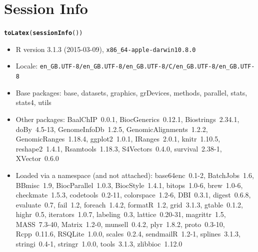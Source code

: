 \documentclass{article}\usepackage[]{graphicx}\usepackage[usenames,dvipsnames]{color}
\makeatletter
\newcommand{\hlstd}[1]{\textcolor[rgb]{0.345,0.345,0.345}{#1}}%
\newcommand{\hlkwd}[1]{\textcolor[rgb]{0.737,0.353,0.396}{\textbf{#1}}}%
\newenvironment{kframe}{%
 \def\at@end@of@kframe{}%
 \ifinner\ifhmode%
  \def\at@end@of@kframe{\end{minipage}}%
  \begin{minipage}{\columnwidth}%
 \fi\fi%
 \def\FrameCommand##1{\hskip\@totalleftmargin \hskip-\fboxsep
 \colorbox{shadecolor}{##1}\hskip-\fboxsep
     \hskip-\linewidth \hskip-\@totalleftmargin \hskip\columnwidth}%
 \MakeFramed {\advance\hsize-\width
   \@totalleftmargin\z@ \linewidth\hsize
   \@setminipage}}%
 {\par\unskip\endMakeFramed%
 \at@end@of@kframe}
\makeatother
\begin{document}
\section{Session Info}
\begin{kframe}
\begin{alltt}
\hlkwd{toLatex}\hlstd{(}\hlkwd{sessionInfo}\hlstd{())}
\end{alltt}
\end{kframe}\begin{itemize}\raggedright
  \item R version 3.1.3 (2015-03-09), \verb|x86_64-apple-darwin10.8.0|
  \item Locale: \verb|en_GB.UTF-8/en_GB.UTF-8/en_GB.UTF-8/C/en_GB.UTF-8/en_GB.UTF-8|
  \item Base packages: base, datasets, graphics, grDevices, methods, parallel,
    stats, stats4, utils
  \item Other packages: BaalChIP~0.0.1, BiocGenerics~0.12.1, Biostrings~2.34.1,
    doBy~4.5-13, GenomeInfoDb~1.2.5, GenomicAlignments~1.2.2,
    GenomicRanges~1.18.4, ggplot2~1.0.1, IRanges~2.0.1, knitr~1.10.5,
    reshape2~1.4.1, Rsamtools~1.18.3, S4Vectors~0.4.0, survival~2.38-1,
    XVector~0.6.0
  \item Loaded via a namespace (and not attached): base64enc~0.1-2,
    BatchJobs~1.6, BBmisc~1.9, BiocParallel~1.0.3, BiocStyle~1.4.1,
    bitops~1.0-6, brew~1.0-6, checkmate~1.5.3, codetools~0.2-11,
    colorspace~1.2-6, DBI~0.3.1, digest~0.6.8, evaluate~0.7, fail~1.2,
    foreach~1.4.2, formatR~1.2, grid~3.1.3, gtable~0.1.2, highr~0.5,
    iterators~1.0.7, labeling~0.3, lattice~0.20-31, magrittr~1.5, MASS~7.3-40,
    Matrix~1.2-0, munsell~0.4.2, plyr~1.8.2, proto~0.3-10, Rcpp~0.11.6,
    RSQLite~1.0.0, scales~0.2.4, sendmailR~1.2-1, splines~3.1.3, stringi~0.4-1,
    stringr~1.0.0, tools~3.1.3, zlibbioc~1.12.0
\end{itemize}


\end{document}
